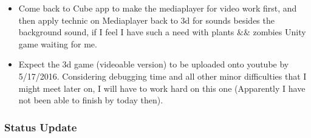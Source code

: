 \documentclass[9pt,b5paper]{article}
\begin{document}
\begin{enumerate}
\begin{itemize}
\item Come back to Cube app to make the mediaplayer for video work first, and then apply technic on Mediaplayer back to 3d for sounds besides the background sound, if I feel I have such a need with plants \&\& zombies Unity game waiting for me.
\item Expect the 3d game (videoable version) to be uploaded onto youtube by 5/17/2016. Considering debugging time and all other minor difficulties that I might meet later on, I will have to work hard on this one (Apparently I have not been able to finish by today then).
\end{itemize}
\end{enumerate}

\subsubsection{Status Update}
\label{sec-1-1-2}
\end{document}

